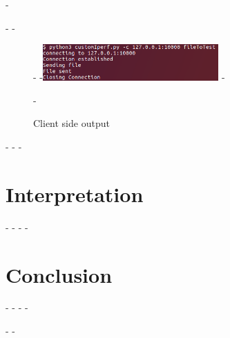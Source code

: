 -\documentclass[a4paper]{article}
\begin{document}
 -
 -\begin{figure}
 -\centering
 -\includegraphics[width=0.6\textwidth]{clientSide.png}
 -\caption{Client side output}
 -\end{figure}
 -
 -\newpage
 -\section{Interpretation}
 -%
 -
 -\newpage 
 -\section{Conclusion}
 -
 -\newpage
 -
 -\listoffigures
 -
 -
\end{document}
